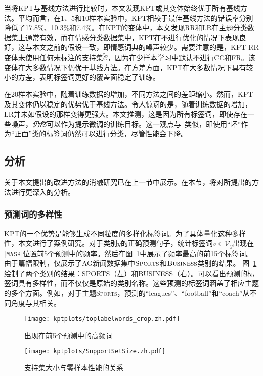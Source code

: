 当将KPT与基线方法进行比较时，本文发现KPT或其变体始终优于所有基线方法。平均而言，在1、5和10样本实验中，KPT相较于最佳基线方法的错误率分别降低了17.8\%、10.3\%和7.4\%。在KPT的变体中，本文发现RR和LR在主题分类数据集上通常有效，而在情感分类数据集中，KPT在不进行优化的情况下表现良好，这与本文之前的假设一致，即情感词典的噪声较少。需要注意的是，KPT-RR变体未使用任何未标注的支持集$\tilde{\mathcal{C}}$，因为在少样本学习中默认不进行CC和FR。该变体在大多数情况下仍优于基线方法。在方差方面，KPT在大多数情况下具有较小的方差，表明标签词更好的覆盖面稳定了训练。

在20样本实验中，随着训练数据的增加，不同方法之间的差距缩小。然而，KPT及其变体仍以稳定的优势优于基线方法。令人惊讶的是，随着训练数据的增加，LR并未如假设的那样变得更强大。本文推测，这是因为所有标签词，即使存在一些噪声，\emph{仍然}可以作为提示微调的训练目标。这一观点与~\citet{gao2020making}类似，即使用“坏”作为“正面”类的标签词仍然可以进行分类，尽管性能会下降。


\subsection{分析}
\label{sec:analysis}
关于本文提出的改进方法的消融研究已在上一节中展示。在本节，将对所提出的方法进行更深入的分析。


\subsubsection{预测词的多样性}

KPT的一个优势是能够生成不同粒度的多样化标签词。为了具体量化这种多样性，本文进行了案例研究。对于类别$y$的正确预测句子，统计标签词$v\in \mathcal{V}_y$出现在$\texttt{[MASK]}$位置前5个预测中的频率。然后在图~\ref{fig:violin}中展示了频率最高的前15个标签词。由于篇幅限制，仅展示了AG新闻数据集中$\textsc{Sports}$和$\textsc{Business}$类别的结果。
图~\ref{fig:violin}绘制了两个类别的结果：\textsc{SPORTS}（左）和\textsc{BUSINESS}（右）。可以看出预测的标签词具有多样性，而不仅仅是原始的类别名称。这些预测的标签词涵盖了相应主题的多个方面。例如，对于主题\textsc{Sports}，预测的“leagues”、“football”和“coach”从不同角度与其相关。

\begin{figure}[H]
    \centering
    \texttt{[image: kptplots/toplabelwords\_crop.zh.pdf]}
    \caption{出现在前5个预测中的高频词}
    \label{fig:violin}
\end{figure}


\label{app:analysis}
\begin{figure}
    \centering
    \texttt{[image: kptplots/SupportSetSize.zh.pdf]}
    \caption{支持集大小与零样本性能的关系}
    \label{fig:calistudy}
\end{figure}

